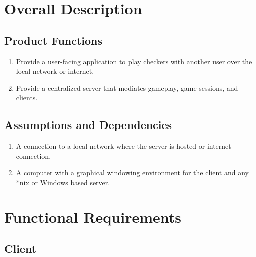 \documentclass{scrreprt}
\begin{document}
\chapter{Overall Description}

\section{Product Functions}

\begin{enumerate}
    \item Provide a user-facing application to play checkers with another user over the local network or internet.
    \item Provide a centralized server that mediates gameplay, game sessions, and clients.
\end{enumerate}

\section{Assumptions and Dependencies}

\begin{enumerate}
    \item A connection to a local network where the server is hosted or internet connection.
    \item A computer with a graphical windowing environment for the client and any *nix or Windows based server.
\end{enumerate}

\chapter{Functional Requirements}

\section{Client}
\end{document}
